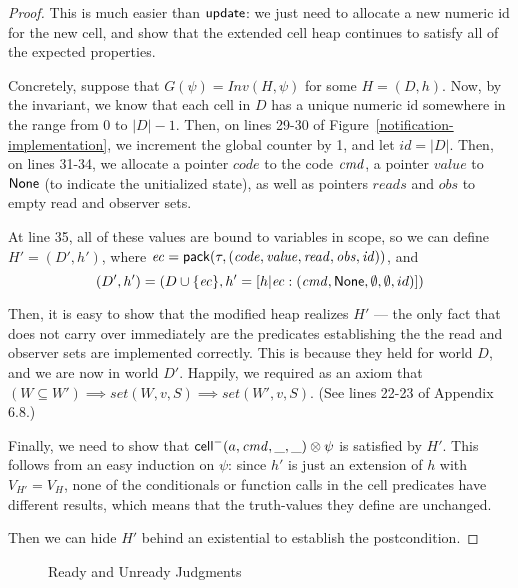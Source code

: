 \begin{proof}
This is much easier than $\mathsf{update}$: we just need to allocate a new
numeric id for the new cell, and show that the extended cell heap
continues to satisfy all of the expected properties.

Concretely, suppose that $G(\psi) = \mathit{Inv}{(H, \psi)}$ for some
$H = (D,h)$. Now, by the invariant, we know that each cell in $D$ has
a unique numeric id somewhere in the range from $0$ to $|D|-1$. Then,
on lines 29-30 of Figure~\ref{notification-implementation}, we
increment the global counter by 1, and let $id = |D|$.  Then, on lines
31-34, we allocate a pointer $\mathit{code}$ to the code $\mathit{cmd}$, a
pointer $\mathit{value}$ to $\mathsf{None}$ (to indicate the unitialized
state), as well as pointers $\mathit{reads}$ and $\mathit{obs}$ to
empty read and observer sets.

At line 35, all of these values are bound to variables in scope, so we
can define $H' = (D',h')$, where $\mathit{ec} = \mathsf{pack}({\tau}, {\mathit{(code, value, read, obs, id)}})$, 
and 
\begin{displaymath}
(D',h') = (D \cup \{{\mathit{ec}}\}, h' = [h|\mathit{ec}: (\mathit{cmd}, \mathsf{None}, \emptyset, \emptyset, id)])
\end{displaymath}

Then, it is easy to show that the modified heap realizes $H'$ --- the
only fact that does not carry over immediately are the predicates
establishing the the read and observer sets are implemented
correctly. This is because they held for world $D$, and we are now in
world $D'$. Happily, we required as an axiom that $(W \subseteq W')
\implies \mathit{set}(W, v, S) \implies \mathit{set}(W', v, S)$. (See 
lines 22-23 of Appendix 6.8.)

Finally, we need to show that $\mathsf{cell}^{-}({a}, {\mathit{cmd}}, {\_}, {\_}) \otimes \psi$ is
satisfied by $H'$. This follows from an easy induction on $\psi$:
since $h'$ is just an extension of $h$ with $V_{H'} = V_H$, none
of the conditionals or function calls in the cell predicates have
different results, which means that the truth-values they define
are unchanged. 

Then we can hide $H'$ behind an existential to establish the postcondition. 
\end{proof}

\begin{figure}
\mbox{}
\caption{Ready and Unready Judgments}
\label{readiness}
\end{figure}

